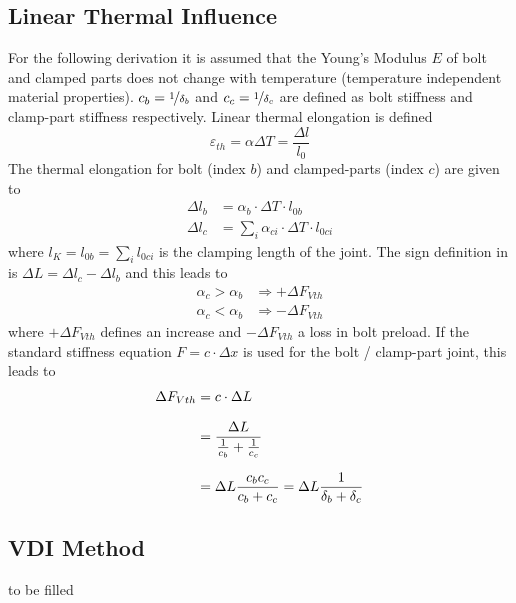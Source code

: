 \subsection{Linear Thermal Influence}
For the following derivation it is assumed that the Young's Modulus $E$ of bolt and clamped parts does 
not change with temperature (temperature independent material properties). $c_b=\nicefrac{1}{\delta_b}$
and $c_c=\nicefrac{1}{\delta_c}$ are defined as bolt stiffness and clamp-part stiffness respectively.
Linear thermal elongation is defined
\begin{equation*}
  \varepsilon_{th} = \alpha \Delta T = \frac{\Delta l}{l_0}
\end{equation*}
The thermal elongation for bolt (index $b$) and clamped-parts (index $c$) are given to
\begin{subequations}
  \begin{align*}
    \Delta l_b &= \alpha_b \cdot \Delta T \cdot l_{0b} \\
    \Delta l_c &= \sum_i \alpha_{ci} \cdot \Delta T \cdot l_{0ci}
  \end{align*}
\end{subequations}
where $l_K = l_{0b} = \sum_i l_{0ci}$ is the clamping length of the joint. The sign definition
in \bat is $\Delta L = \Delta l_c - \Delta l_b$ and this leads to 
\begin{subequations}
  \begin{align*}
    \alpha_c > \alpha_b &\Rightarrow \pmb{+}\Delta F_{Vth} \\
    \alpha_c < \alpha_b &\Rightarrow \pmb{-}\Delta F_{Vth}
  \end{align*}
\end{subequations}
where $\pmb{+}\Delta F_{Vth}$ defines an increase and $\pmb{-}\Delta F_{Vth}$ a loss in bolt preload.
If the standard stiffness equation $F=c \cdot \Delta x$ is used for the bolt / clamp-part joint, this leads to
\begin{subequations}
  \setlength{\jot}{10pt}
  \begin{align}
    \Delta F_{Vth} &= c \cdot \Delta L \\
    &= \frac{\Delta L}{\frac{1}{c_b}+\frac{1}{c_c}} \\
    &= \Delta L \frac{c_b c_c}{c_b + c_c} = \Delta L \frac{1}{\delta_b + \delta_c}
    \label{equ:dFVth}
  \end{align}
\end{subequations}

\subsection{VDI Method}
to be filled

